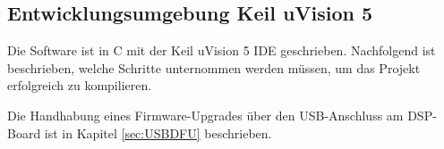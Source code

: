 \subsection{Entwicklungsumgebung Keil uVision 5}
\label{sec:IDE}

Die Software ist in C mit der Keil uVision 5 IDE geschrieben. Nachfolgend ist beschrieben, welche Schritte unternommen werden müssen, um das Projekt erfolgreich zu kompilieren.

Die Handhabung eines Firmware-Upgrades über den USB-Anschluss am DSP-Board ist in Kapitel \ref{sec:USBDFU} beschrieben.
